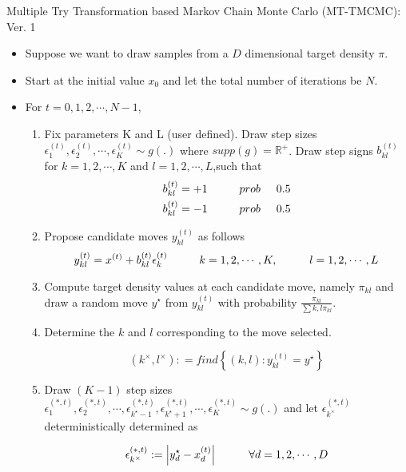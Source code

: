\begin{algorithm}
\caption{\small{Multiple Try Transformation based Markov Chain Monte Carlo (MT-TMCMC): Ver. 1}}\label{mt-tmcmc-ver1}
\begin{itemize}
\item Suppose we want to draw samples from a $D$ dimensional target density $\pi$. 
\item Start at the initial value $x_{0}$ and let the total number of iterations be $N$. 
\item For $t=0,1,2,\cdots, N-1$,
\begin{enumerate}
\item Fix parameters K and L (user defined). Draw step sizes $\epsilon^{(t)}_{1}, \epsilon^{(t)}_{2}, \cdots, \epsilon^{(t)}_{K} \sim g(.)$ where $supp(g) =\mathbb{R}^{+}$.  Draw step signs  $b^{(t)}_{kl}$ for $k=1,2, \cdots, K$ and $l=1,2, \cdots, L$,such that 
\begin{align*}
b^{(t)}_{kl} = + 1 \hspace{1 cm} prob \hspace{0.5 cm} 0.5 \\
b^{(t)}_{kl} = - 1 \hspace{1 cm} prob \hspace{0.5 cm} 0.5 
\end{align*}
\item Propose candidate moves $y^{(t)}_{kl}$ as follows 
$$ y^{(t)}_{kl} = x^{(t)} + b^{(t)}_{kl}\epsilon^{(t)}_{k} \hspace{1 cm} k =1,2,\cdots, K, \hspace{1 cm} l =1,2,\cdots, L $$

\item Compute target density values at each candidate move, namely $\pi_{kl}$ and draw a random move $y^{\star}$ 
from $y^{(t)}_{kl}$ with probability $ \frac{\pi_{kl}} {\sum{k,l} \pi_{kl}}$.

\item Determine the $k$ and $l$ corresponding to the move selected.

$$ (k^{\times}, l^{\times}) : = find \left \{(k,l): y^{(t)}_{kl} = y^{\star} \right \} $$

\item  Draw $(K-1)$ step sizes  $\epsilon^{(*,t)}_{1}, \epsilon^{(*, t)}_{2}, \cdots, \epsilon^{(*, t)}_{k^{\star}-1},  \epsilon^{(*, t)}_{k^{\star}+1}, \cdots,  \epsilon^{(*, t)}_{K} \sim g(.)$ and let $\epsilon^{(*,t)}_{k^{\times}}$ deterministically determined as 

$$  \epsilon^{(*,t)}_{k^{\times}}  : = \left | y^{\star}_{d} - x^{(t)} _{d} \right |  \hspace{1 cm} \forall d=1,2, \cdots, D $$


\end{enumerate}
\end{itemize}
\end{algorithm}
